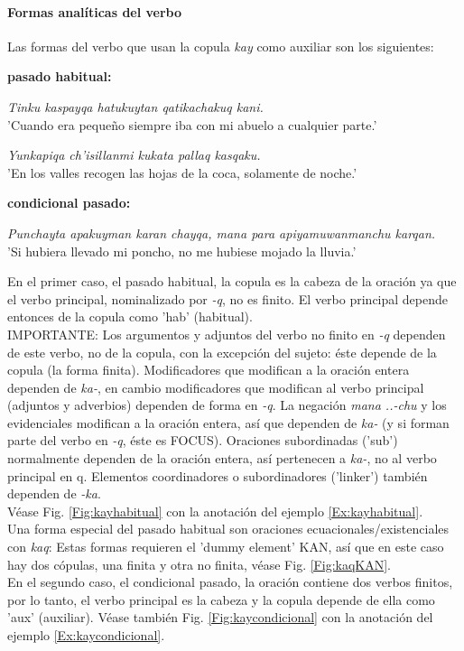 \documentclass[a4paper,11pt,DIV12]{scrartcl}
\begin{document}
\paragraph{Formas anal\'iticas del verbo}

Las formas del verbo que usan la copula {\em kay} como auxiliar son los siguientes:

\begin{examples}
 \item[]\textbf{pasado habitual:} \\
    \item\label{Ex:kayhabitual} {\em Tinku kaspayqa hatukuytan qatikachakuq kani.}\\ 
	  'Cuando era peque\~no siempre iba con mi abuelo a cualquier parte.'
    \item {\em Yunkapiqa ch'isillanmi kukata pallaq kasqaku.}\\
 	  'En los valles recogen las hojas de la coca, solamente de noche.'
 \item[]\textbf{condicional pasado:}\\
   \item\label{Ex:kaycondicional} {\em Punchayta apakuyman karan chayqa, mana para apiyamuwanmanchu karqan.}\\
	'Si hubiera llevado mi poncho, no me hubiese mojado la lluvia.'
\end{examples}

En el primer caso, el pasado habitual, la copula es la cabeza de la oraci\'on ya que el verbo principal, nominalizado por {\em -q}, no es finito. El verbo principal depende entonces de la copula como 'hab' (habitual).\\
IMPORTANTE: Los argumentos y adjuntos del verbo no finito en {\em -q} dependen de este verbo, no de la copula, con la excepci\'on del sujeto: \'este depende de la copula (la forma finita). Modificadores que modifican a la oraci\'on entera dependen de {\em ka-}, en cambio modificadores que modifican al verbo principal (adjuntos y adverbios) dependen de forma en {\em -q}. La negaci\'on {\em mana ..-chu} y los evidenciales modifican a la oraci\'on entera, as\'i que dependen de {\em ka-} (y si forman parte del verbo en {\em -q}, \'este es FOCUS). Oraciones subordinadas ('sub') normalmente dependen de la oraci\'on entera, as\'i pertenecen a {\em ka-}, no al verbo principal en {\-q}. Elementos coordinadores o subordinadores ('linker') tambi\'en dependen de {\em -ka}.\\
V\'ease Fig. \ref{Fig:kayhabitual} con la anotaci\'on del ejemplo \ref{Ex:kayhabitual}.\\
Una forma especial del pasado habitual son oraciones ecuacionales/existenciales con {\em kaq}: Estas formas requieren el 'dummy element' KAN, as\'i que en este caso hay dos c\'opulas, una finita y otra no finita, v\'ease Fig. \ref{Fig:kaqKAN}.\\ 
En el segundo caso, el condicional pasado, la oraci\'on contiene dos verbos finitos, por lo tanto, el verbo principal es la cabeza y la copula depende de ella como 'aux' (auxiliar). V\'ease tambi\'en Fig. \ref{Fig:kaycondicional} con la anotaci\'on del ejemplo \ref{Ex:kaycondicional}.
\end{document}

